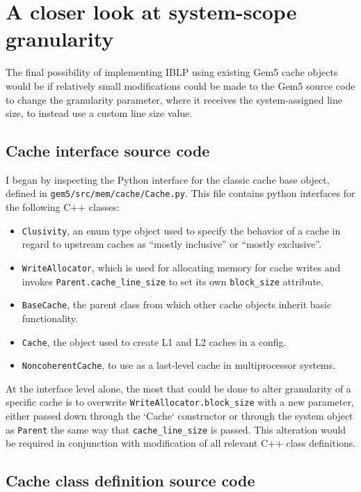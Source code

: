 \documentclass[12pt,twoside]{reedthesis}
\begin{document}
\section{A closer look at system-scope granularity}

	The final possibility of implementing IBLP using existing Gem5 cache objects would be if relatively small modifications could be made to the Gem5 source code to change the granularity parameter, where it receives the system-assigned line size, to instead use a custom line size value.

	\subsection*{Cache interface source code}

	I began by inspecting the Python interface for the classic cache base object, defined in \verb`gem5/src/mem/cache/Cache.py`. This file contains python interfaces for the following C++ classes:
	\begin{itemize}
		\item \verb`Clusivity`, an enum type object used to specify the behavior of a cache in regard to upstream caches as ``mostly inclusive'' or ``mostly exclusive''.
		\item \verb`WriteAllocator`, which is used for allocating memory for cache writes and invokes \verb`Parent.cache_line_size` to set its own \verb`block_size` attribute.
		\item \verb`BaseCache`, the parent class from which other cache objects inherit basic functionality.
		\item \verb`Cache`, the object used to create L1 and L2 caches in a config.
		\item \verb`NoncoherentCache`, to use as a last-level cache in multiprocessor systems.
	\end{itemize}

	At the interface level alone, the most that could be done to alter granularity of a specific cache is to overwrite \verb`WriteAllocator.block_size` with a new parameter, either passed down through the `Cache` constructor or through the system object as \verb`Parent` the same way that \verb`cache_line_size` is passed. This alteration would be required in conjunction with modification of all relevant C++ class definitions.

	\subsection*{Cache class definition source code}
\end{document}
